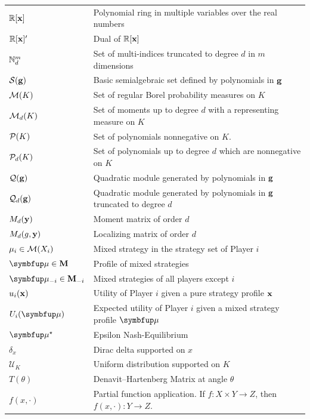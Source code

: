 \begin{tabular}{ll}
    $\mathbb{R}[\mathbf{x}]$ & Polynomial ring in multiple variables over the real numbers \\
    $\mathbb{R}[\mathbf{x}]'$ & Dual of $\mathbb{R}[\mathbf{x}]$ \\
    $\mathbb{N}^m_d$ & Set of multi-indices truncated to degree $d$ in $m$ dimensions \\
    $\mathcal{S}(\mathbf{g})$ & Basic semialgebraic set defined by polynomials in $\mathbf{g}$ \\
    $\mathcal{M}(K)$ & Set of regular Borel probability measures on $K$\\
    $\mathcal{M}_d(K)$ & Set of moments up to degree $d$ with a representing measure on $K$ \\
    $\mathcal{P}(K)$ & Set of polynomials nonnegative on $K$. \\
    $\mathcal{P}_d(K)$ & Set of polynomials up to degree $d$ which are nonnegative on $K$ \\
    $\mathcal{Q}(\mathbf{g})$ & Quadratic module generated by polynomials in $\mathbf{g}$\\
    $\mathcal{Q}_d(\mathbf{g})$ & Quadratic module generated by polynomials in $\mathbf{g}$ truncated to degree $d$\\
    $M_d(\mathbf{y})$ & Moment matrix of order $d$ \\
    $M_d(g,\mathbf{y})$ & Localizing matrix of order $d$\\
    $\mu_i \in \mathcal{M}(X_i)$ & Mixed strategy in the strategy set of Player $i$\\
    $\bmu \in \bM$ & Profile of mixed strategies\\
    $\bmu_{-i} \in \bM_{-i}$ & Mixed strategies of all players except $i$\\
    $u_i(\mathbf{x})$ & Utility of Player $i$ given a pure strategy profile $\mathbf{x}$\\
    $U_i(\bmu)$ & Expected utility of Player $i$ given a mixed strategy profile $\bmu$\\
    $\bmu^\star$ & Epsilon Nash-Equilibrium \\
    $\delta_{x}$ & Dirac delta supported on $x$ \\
    $\mathcal{U}_K$ & Uniform distribution supported on $K$\\
    $T(\theta)$ & Denavit–Hartenberg Matrix at angle $\theta$ \\
    $f(x,\cdot)$ & Partial function application. If $f\colon X\times Y \to Z$, then $f(x,\cdot)\colon Y\to Z$. \\
\end{tabular}
